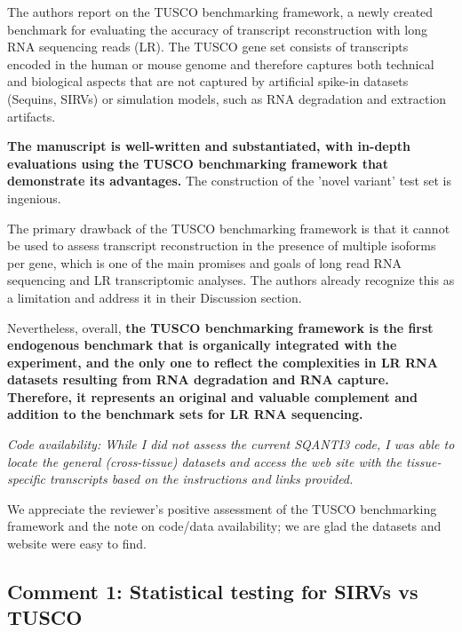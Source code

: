 \documentclass[11pt]{article}
\begin{document}
\begin{positiveremarks}
The authors report on the TUSCO benchmarking framework, a newly created benchmark for evaluating the accuracy of transcript reconstruction with long RNA sequencing reads (LR). The TUSCO gene set consists of transcripts encoded in the human or mouse genome and therefore captures both technical and biological aspects that are not captured by artificial spike-in datasets (Sequins, SIRVs) or simulation models, such as RNA degradation and extraction artifacts.

\vspace{0.2cm}
\textbf{The manuscript is well-written and substantiated, with in-depth evaluations using the TUSCO benchmarking framework that demonstrate its advantages.} The construction of the 'novel variant' test set is ingenious.

\vspace{0.2cm}
The primary drawback of the TUSCO benchmarking framework is that it cannot be used to assess transcript reconstruction in the presence of multiple isoforms per gene, which is one of the main promises and goals of long read RNA sequencing and LR transcriptomic analyses. The authors already recognize this as a limitation and address it in their Discussion section.

\vspace{0.2cm}
Nevertheless, overall, \textbf{the TUSCO benchmarking framework is the first endogenous benchmark that is organically integrated with the experiment, and the only one to reflect the complexities in LR RNA datasets resulting from RNA degradation and RNA capture. Therefore, it represents an original and valuable complement and addition to the benchmark sets for LR RNA sequencing.}

\vspace{0.2cm}
\textit{Code availability: While I did not assess the current SQANTI3 code, I was able to locate the general (cross-tissue) datasets and access the web site with the tissue-specific transcripts based on the instructions and links provided.}
\end{positiveremarks}

\begin{responseboxnew}
We appreciate the reviewer's positive assessment of the TUSCO benchmarking framework and the note on code/data availability; we are glad the datasets and website were easy to find.
\end{responseboxnew}

\subsection{Comment 1: Statistical testing for SIRVs vs TUSCO}
\end{document}
